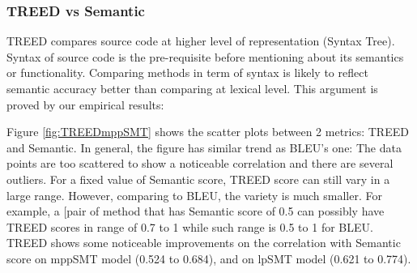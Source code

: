 \subsubsection{\textbf{TREED vs Semantic}}
TREED compares source code at higher level of representation (Syntax Tree). Syntax of source code is the pre-requisite before mentioning about its semantics or functionality. Comparing methods in term of syntax is likely to reflect semantic accuracy better than comparing at lexical level. This argument is proved by our empirical results: 


Figure \ref{fig:TREEDmppSMT} shows the scatter plots between 2 metrics: TREED and Semantic. In general, the figure has similar trend as BLEU's one: The data points are too scattered to show a noticeable correlation and there are several outliers. For a fixed value of Semantic score, TREED score can still vary in a large range. However, comparing to BLEU, the variety is much smaller. For example, a [pair of method that has Semantic score of 0.5 can possibly have TREED scores in range of 0.7 to 1 while such range is 0.5 to 1 for BLEU. TREED shows some noticeable improvements on the correlation with Semantic score on mppSMT model (0.524 to 0.684), and on lpSMT model (0.621 to 0.774). 

%




